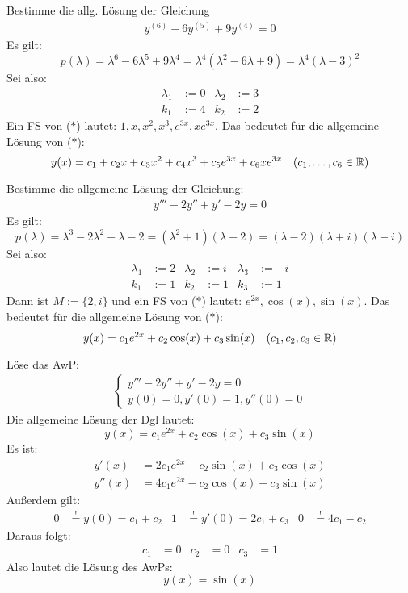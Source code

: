 \documentclass[a4paper,twoside,DIV15,BCOR12mm,chapterprefix=true,headings=twolinechapter]{scrbook}
\begin{document}
\begin{beispiele}
\item Bestimme die allg. Lösung der Gleichung
\begin{align*}
\tag{$*$} y^{(6)}-6y^{(5)}+9y^{(4)}=0
\end{align*}
Es gilt:
\[p(\lambda)=\lambda^6-6\lambda^5+9\lambda^4=\lambda^4(\lambda^2-6\lambda+9)=\lambda^4(\lambda-3)^2\]
Sei also:
\begin{align*}
\lambda_1&:=0&\lambda_2&:=3\\
k_1&:=4&k_2&:=2
\end{align*}
Ein FS von ($*$) lautet: $1,x,x^2,x^3,e^{3x},xe^{3x}$. Das bedeutet für die allgemeine Lösung von ($*$):
\[y(x)=c_1+c_2x+c_3x^2+c_4x^3+c_5e^{3x}+c_6xe^{3x}\quad(c_1,\ldots,c_6\in\mathbb{R})\]
\item Bestimme die allgemeine Lösung der Gleichung:
\begin{align*}
\tag{$*$} y'''-2y''+y'-2y=0
\end{align*}
Es gilt:
\[p(\lambda)=\lambda^3-2\lambda^2+\lambda-2=(\lambda^2+1)(\lambda-2)=(\lambda-2)(\lambda+i)(\lambda-i)\]
Sei also:
\begin{align*}
\lambda_1&:=2&\lambda_2&:=i&\lambda_3&:=-i\\
k_1&:=1&k_2&:=1&k_3&:=1
\end{align*}
Dann ist $M:=\{2,i\}$ und ein FS von ($*$) lautet: $e^{2x},\cos(x),\sin(x)$. Das bedeutet für
die allgemeine Lösung von ($*$):
\[y(x)=c_1e^{2x}+c_2\cos(x)+c_3\sin(x)\quad (c_1,c_2,c_3\in\mathbb{R})\]
\item Löse das AwP:
\begin{align*}
\begin{cases}
y'''-2y''+y'-2y=0\\
y(0)=0,y'(0)=1,y''(0)=0
\end{cases}
\end{align*}
Die allgemeine Lösung der Dgl lautet:
\[y(x)=c_1e^{2x}+c_2\cos(x)+c_3\sin(x)\]
Es ist:
\begin{align*}
y'(x)&=2c_1e^{2x}-c_2\sin(x)+c_3\cos(x)\\
y''(x)&=4c_1e^{2x}-c_2\cos(x)-c_3\sin(x)
\end{align*}
Außerdem gilt:
\begin{align*}
0&\stackrel!=y(0)=c_1+c_2&1&\stackrel!=y'(0)=2c_1+c_3&0&\stackrel!=4c_1-c_2
\end{align*} 
Daraus folgt:
\begin{align*}
c_1&=0&c_2&=0&c_3&=1
\end{align*}
Also lautet die Lösung des AwPs:
\[y(x)=\sin(x)\]
\end{beispiele}
\end{document}
